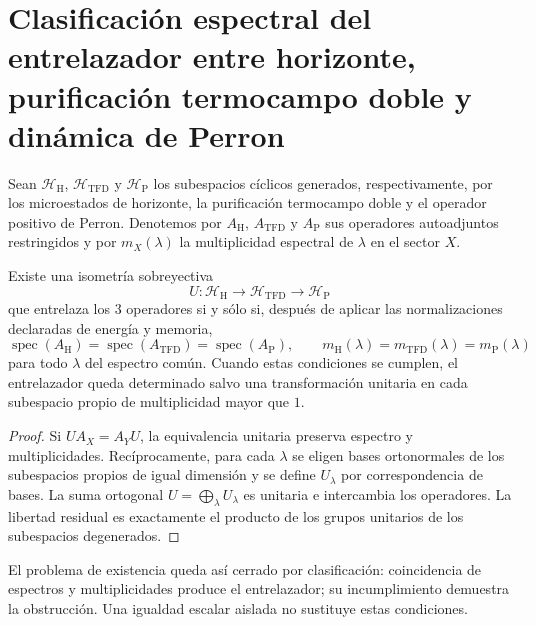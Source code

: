 
\section{Clasificación espectral del entrelazador entre horizonte, purificación termocampo doble y dinámica de Perron}
\label{sec:ivv-horizon-tfd-perron-classification}

Sean \(\mathcal H_{\mathrm H}\), \(\mathcal H_{\mathrm{TFD}}\) y
\(\mathcal H_{\mathrm P}\) los subespacios cíclicos generados,
respectivamente, por los microestados de horizonte, la purificación
termocampo doble y el operador positivo de Perron. Denotemos por
\(A_{\mathrm H}\), \(A_{\mathrm{TFD}}\) y \(A_{\mathrm P}\) sus operadores
autoadjuntos restringidos y por \(m_X(\lambda)\) la multiplicidad espectral
de \(\lambda\) en el sector \(X\).

\begin{theorem}
\label{thm:ivv-horizon-tfd-perron-classification}
Existe una isometría sobreyectiva
\[
 U:\mathcal H_{\mathrm H}\longrightarrow\mathcal H_{\mathrm{TFD}}
 \longrightarrow\mathcal H_{\mathrm P}
\]
que entrelaza los \(3\) operadores si y sólo si, después de aplicar las
normalizaciones declaradas de energía y memoria,
\[
 \operatorname{spec}(A_{\mathrm H})
 =\operatorname{spec}(A_{\mathrm{TFD}})
 =\operatorname{spec}(A_{\mathrm P}),
 \qquad
 m_{\mathrm H}(\lambda)=m_{\mathrm{TFD}}(\lambda)=m_{\mathrm P}(\lambda)
\]
para todo \(\lambda\) del espectro común. Cuando estas condiciones se
cumplen, el entrelazador queda determinado salvo una transformación unitaria
en cada subespacio propio de multiplicidad mayor que \(1\).
\end{theorem}

\begin{proof}
Si \(U A_X=A_YU\), la equivalencia unitaria preserva espectro y
multiplicidades. Recíprocamente, para cada \(\lambda\) se eligen bases
ortonormales de los subespacios propios de igual dimensión y se define
\(U_\lambda\) por correspondencia de bases. La suma ortogonal
\(U=\bigoplus_\lambda U_\lambda\) es unitaria e intercambia los operadores.
La libertad residual es exactamente el producto de los grupos unitarios de
los subespacios degenerados.
\end{proof}

El problema de existencia queda así cerrado por clasificación: coincidencia
de espectros y multiplicidades produce el entrelazador; su incumplimiento
demuestra la obstrucción. Una igualdad escalar aislada no sustituye estas
condiciones.

